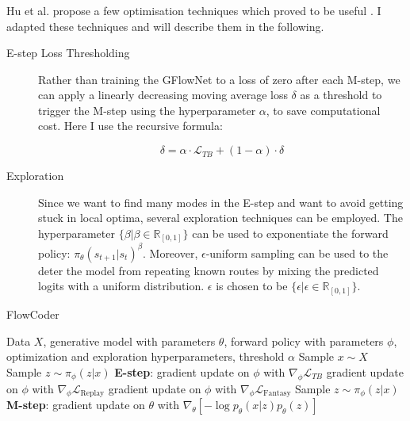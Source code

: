 \subsubsection{}\label{sec:optim}
Hu et al. propose a few optimisation techniques which proved to be useful \cite{hu_gflownet-em_2023}. I adapted these techniques and will describe them in the following.
\begin{description}
    \item[E-step Loss Thresholding] Rather than training the GFlowNet to a loss of zero after each M-step, we can apply a linearly decreasing moving average loss $\delta$ as a threshold to trigger the M-step using the hyperparameter $\alpha$, to save computational cost. Here I use the recursive formula:

    \begin{equation}\label{eq:threshold}
        \delta = \alpha \cdot \mathcal{L}_{TB} + (1 - \alpha) \cdot \delta
    \end{equation}
    \item[Exploration] Since we want to find many modes in the E-step and want to avoid getting stuck in local optima, several exploration techniques can be employed.
    The hyperparameter $\{\beta \vert \beta \in \mathbb{R}_{[0, 1]} \}$  can be used to exponentiate the forward policy: $ \pi_\theta(s_{t+1}|s_t)^\beta $.
    Moreover, $\epsilon$-uniform sampling can be used to the deter the model from repeating known routes by mixing the predicted logits with a uniform distribution. $\epsilon$ is chosen to be $\{\epsilon \vert \epsilon \in \mathbb{R}_{[0, 1]} \}$.
\end{description}


\begin{algorithm}[H]
    \caption{FlowCoder}
    \begin{algorithmic}[1]
    \Require Data $X$, generative model with parameters $\theta$, forward policy with parameters $\phi$, optimization and exploration hyperparameters, threshold $\alpha$
    \Repeat
        \State Sample $x \sim X$
        \State Sample $z \sim \pi_\phi(z|x)$
        \State \textbf{E-step}: gradient update on $\phi$ with $\nabla_\phi \mathcal{L}_{TB}$
            \State gradient update on $\phi$ with $\nabla_\phi\mathcal{L}_{\text{Replay}}$
        \EndIf
            \State gradient update on $\phi$ with $\nabla_\phi\mathcal{L}_{\text{Fantasy}}$
        \EndIf
            \State Sample $z \sim \pi_\phi(z|x)$
            \State \textbf{M-step}: gradient update on $\theta$ with $\nabla_\theta[-\log p_\theta(x|z)p_\theta(z)]$
        \EndIf
    \end{algorithmic}
    \label{alg:flowcoder}
    \end{algorithm}







